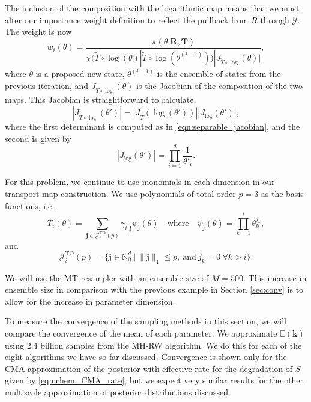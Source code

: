 \documentclass[final]{siamltex}
\newcommand{\edit}[1]{{\color{red} #1}}
\begin{document}
\edit{ The inclusion of the composition with the logarithmic map} means that we must alter our importance weight definition to reflect the pullback from $R$ through $\mathcal{Y}$. The weight is now
\begin{equation}
	w_i(\theta) = \frac{\pi(\theta|\mathbf{R},\mathbf{T})}{\chi(\tilde{T}\circ\log(\theta)|\tilde{T}\circ\log(\theta^{(i-1)}))|J_{\tilde{T}\circ\log}(\theta)|},
\end{equation}
where $\theta$ is a proposed new state, $\theta^{(i-1)}$ is the ensemble of states from the previous iteration, and $J_{\tilde{T}\circ\log}(\theta)$ is the Jacobian of the composition of the two maps. This Jacobian is straightforward to calculate,
\begin{equation}
	|J_{\tilde{T}\circ\log}(\theta')| = |J_{\tilde{T}}(\log(\theta'))||J_{\log}(\theta')|,
\end{equation}
where the first determinant is computed as in
\eqref{eqn:separable_jacobian}, and the second is given by
\begin{equation}
	|J_{\log}(\theta')| = \prod\limits_{i=1}^d \frac{1}{\theta'_i}.
\end{equation}

For this problem, we continue to use monomials in each dimension in our transport map construction. We use polynomials of total order $p=3$ as the basis functions, i.e.
\begin{equation}
	T_i(\theta) = \sum_{\mathbf{j}\in\mathcal{J}^{\text{TO}}_i(p)} \gamma_{i,\mathbf{j}}\psi_{\mathbf{j}}(\theta) \quad \text{where} \quad \psi_\mathbf{j}(\theta) = \prod\limits_{k=1}^i \theta_k^{j_k},
\end{equation}
and
\begin{equation}
	\mathcal{J}^{\text{TO}}_i(p) = \{\mathbf{j} \in \mathbb{N}^d_0\ |\ \|\mathbf{j}\|_1 \leq p, \ \text{and}\ j_k = 0\ \forall k > i\}.
\end{equation}

We will use the MT\cite{russ2017parallel} resampler with an ensemble size of
$M=500$. This increase in ensemble size in comparison with the previous
example in Section \ref{sec:conv} is to allow for the increase in parameter dimension.

To measure the convergence of the sampling methods in this section, we
will compare the convergence of the mean of each parameter. We
approximate $\mathbb{E}(\mathbf{k})$ using 2.4 billion samples from
the MH-RW algorithm. We do this for each of the eight algorithms we
have so far discussed. Convergence is shown only for the CMA
approximation of the posterior with effective rate for
the degradation of $S$ given by \eqref{eqn:chem_CMA_rate}, but we
expect very similar results for the other multiscale approximation of
posterior distributions
discussed.
\end{document}

